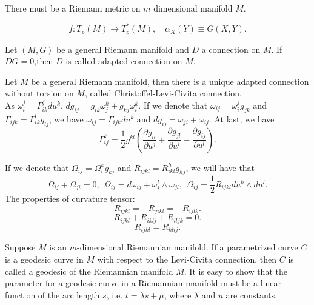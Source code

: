 \vspace{15pt}

\begin{newthem}
There must be a Riemann metric on $m$ dimensional manifold $M$.
\end{newthem}

\vspace{15pt}

\begin{newdef}
\[f:T_p(M) \to T^*_p(M) , \quad \alpha_X(Y) \equiv G(X,Y).\]
\end{newdef}

\vspace{15pt}

\begin{newdef}
Let $(M,G)$ be a general Riemann manifold and $D$ a connection on $M$. If $DG=0$,then $D$ is called adapted connection on $M$.
\end{newdef}

\vspace{15pt}

\begin{newprop} 
Let $M$ be a general Riemann manifold, then there is a unique adapted connection without torsion on $M$, called Christoffel-Levi-Civita connection. \\
As $\omega^{j}_{i} = \Gamma^{j}_{ik}du^k$, $dg_{ij} = g_{ik}\omega^{k}_{j} + g_{kj}\omega^{k}_{i}$.
If we denote that $\omega_{ij} = \omega_{i}^{j}g_{jk}$ and $\Gamma_{ijk} = \Gamma_{ik}^{l}g_{lj}$, we have $\omega_{ij}=\Gamma_{ijk}du^k$ and $dg_{ij} = \omega_{ji}+ \omega_{ij}$.
At last, we have
\[\Gamma^{k}_{ij} = \frac{1}{2} g^{kl}(\frac{\partial g_{il}}{\partial u^j} + \frac{\partial g_{jl}}{\partial u^i} - \frac{\partial g_{ij}}{\partial u^l}).\]
\end{newprop}

\begin{newprop}
If we denote that $\Omega_{ij} = \Omega_{i}^{k}g_{kj}$ and $R_{ijkl} = R^{h}_{ikl}g_{hj}$, we will have that
\[\Omega_{ij} + \Omega_{ji} = 0,\ \ \Omega_{ij} = d\omega_{ij} + \omega_{i}^{l} \wedge \omega_{jl},\ \ \Omega_{ij} = \frac{1}{2}R_{ijkl}du^k \wedge du^l.\]
The properties of curvature tensor:
\[R_{ijkl} = -R_{jikl} = -R_{ijlk}.\]
\[R_{ijkl}+R_{iklj}+R_{iljk}=0.\]
\[R_{ijkl} = R_{klij}.\]
\end{newprop}

\begin{newdef}[Geodesic]
Suppose $M$ is an $m$-dimensional Riemannian manifold. 
If a parametrized curve $C$ is a geodesic curve in $M$ with respect to the Levi-Civita connection, then $C$ is called a geodesic of the Riemannian manifold $M$.
It is easy to show that the parameter for a geodesic curve in a Riemannian manifold must be a linear function of the arc length $s$, i.e. $t = \lambda s + \mu$, where $\lambda$ and $u$ are constants.
\end{newdef}

